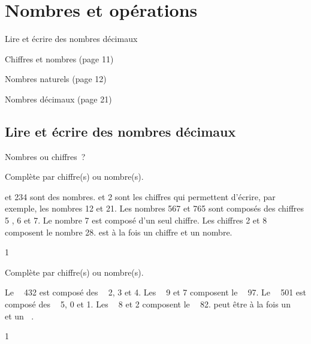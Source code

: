\documentclass[a4paper,11pt]{report}
\begin{document}
\newcommand{\chapterName}{Nombres et opérations}
\newcommand{\serieName}{Lire et écrire des nombres décimaux}


\chapter*{\chapterName}
\thispagestyle{empty}

\begin{amL}{\serieName}{
\item Chiffres et nombres (page 11)
\item Nombres naturels (page 12)
\item Nombres décimaux (page 21)
}
\end{amL}
\section*{\serieName}
\setcounter{page}{1}
\thispagestyle{firstPage}






\begin{resolu}{Nombres ou chiffres~?}{Complète  par {\color{blue}chiffre(s)} ou {\color{blue}nombre(s)}.
\begin{tasks}[after-item-skip = 0.5em]
 et 234 sont des {nombres}.
 et 2 sont les {\color{blue}chiffres} qui permettent d'écrire, par exemple,  les {\color{blue}nombres}  12 et 21. 
\task Les {\color{blue}nombres} 567 et 765 sont composés des {\color{blue}chiffres} 5 , 6 et 7.
\task Le {\color{blue}nombre} 7 est composé d'un seul {\color{blue}chiffre}.
\task Les {\color{blue}chiffres} 2 et 8 composent le {\color{blue}nombre} 28.
 est à la fois un {\color{blue}chiffre} et un {\color{blue}nombre}.
\end{tasks}}{1}
\end{resolu}

\begin{exop}{
Complète par {\color{blue}chiffre(s)} ou {\color{blue}nombre(s)}.

\begin{tasks}[after-item-skip = 0.5em]
\task Le $\;$\hrulefill$\;$ 432 est composé des $\;$\hrulefill$\;$ 2, 3 et 4.
\task Les $\;$\hrulefill$\;$ 9 et 7 composent le $\;$\hrulefill$\;$ 97.
\task Le $\;$\hrulefill$\;$ 501 est composé des $\;$\hrulefill$\;$ 5, 0 et 1.
\task Les $\;$\hrulefill$\;$ 8 et 2 composent le $\;$\hrulefill$\;$ 82.
 peut être à la fois un $\;$\hrulefill$\;$ et un $\;$\hrulefill$\;$.
\end{tasks}
}{1}\end{exop}
\end{document}
